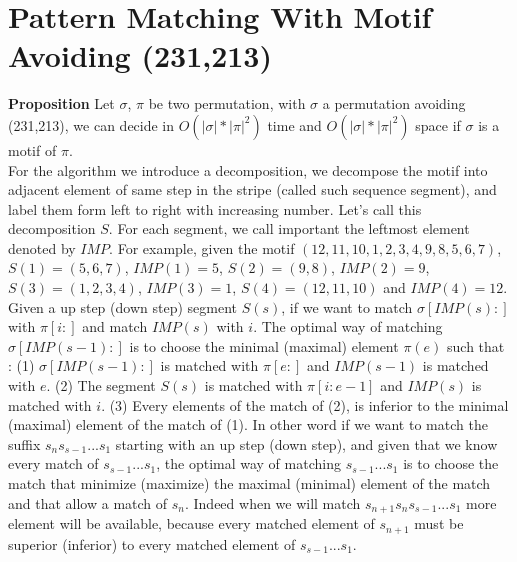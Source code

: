 \documentclass[12pt, a4paper]{article}
\newcommand{\ptext}{\pi}
\newcommand{\pmotif}{\sigma}
\newcounter{num}
\newcommand{\num}{\stepcounter{num} }
\begin{document}
		
		\section{Pattern Matching With Motif Avoiding (231,213)}	

			\textbf{Proposition  \num \thenum} Let $\pmotif$, $\ptext$ 
			be two permutation,
			with  $\pmotif$ a permutation avoiding (231,213), 
			we can decide in $O(|\pmotif|*|\ptext|^2)$ time
			and $O(|\pmotif|*|\ptext|^2)$ space
			if $\pmotif$ 
			is a motif of $\ptext$.\\
			
			
			For the algorithm we introduce a decomposition,
			we decompose the motif into
			adjacent element of same step in the stripe 
			(called such sequence segment),
			and label them form left to right
			with increasing number.
			Let's call this decomposition $S$.
			For each segment, we call important 
			the leftmost element denoted by $IMP$.
			For example, given the motif $(12,11,10,1,2,3,4,9,8,5,6,7)$,
			$S(1)=(5,6,7)$, $IMP(1)=5$, 
			$S(2)=(9,8)$, $IMP(2)=9$, 
			$S(3)=(1,2,3,4)$, $IMP(3)=1$, 
			$S(4)=(12,11,10)$ and $IMP(4)=12$.\\
			
			Given a up step (down step) segment $S(s)$,
			if we want to match 
			$\pmotif[IMP(s):]$
			with $\ptext[i:]$
			and match $IMP(s)$
			with $i$.
			The optimal way
			of matching
			$\pmotif[IMP(s-1):]$
			is to choose the
			minimal (maximal) element $\ptext(e)$
			such that :
			(1) $\pmotif[IMP(s-1):]$ is matched with $\ptext[e:]$
			and $IMP(s-1)$ is matched with $e$.
			(2) The segment $S(s)$ is matched with $\ptext[i:e-1]$
			and $IMP(s)$ is matched with $i$.
			(3) Every elements of the match of (2),
			is inferior to the minimal (maximal) element of the match of (1).
			In other word if we want to
			match the suffix $s_ns_{s-1}...s_1$
			starting with an up step (down step),
			and given that we know every
			match of $s_{s-1}...s_1$,
			the optimal way of matching
			$s_{s-1}...s_1$
			is to choose the match
			that minimize (maximize)
			the maximal (minimal)
			element of the match
			and that allow a match
			of $s_n$.
			Indeed when we will 
			match $s_{n+1}s_ns_{s-1}...s_1$
			more element will be available,
			because every matched 
			element of $s_{n+1}$
			must be superior (inferior)
			to every matched element
			of $s_{s-1}...s_1$.\\
			  
\end{document}
